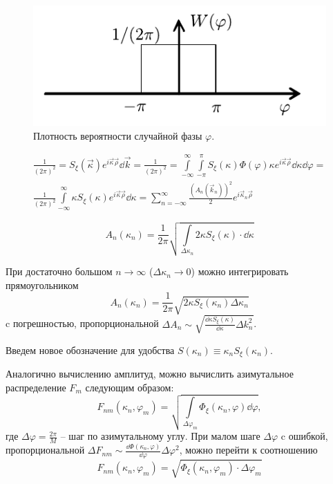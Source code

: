 \documentclass[a4paper,14pt]{extarticle}
\renewcommand*{\phi}{\varphi}
\begin{document}
\begin{figure}[ht]
    \centering
    \includegraphics[scale=1]{fig/image65}
    \caption{Плотность вероятности случайной фазы $\phi$.}
    \label{fig:phase}
\end{figure}


\begin{gather}
    \frac{1}{(2 \pi)^2} = S_{\xi}(\vec \kappa) e^{i \vec \kappa \vec \rho} \dd \vec k = 
    \frac{1}{(2 \pi)^2} = 
        \int\limits_{-\infty}^{\infty}
        \int\limits_{- \pi}^{\pi} 
    S_\xi(\kappa) \Phi(\phi) \kappa e^{i \vec \kappa\vec \rho} \dd \kappa \dd \phi = \\
    \frac{1}{(2 \pi)^2} \int\limits_{-\infty}^{\infty} \kappa S_\xi
    (\kappa) e^{i \vec \kappa 
    \vec \rho} \dd \kappa = \sum\limits_{n=-\infty}^{\infty} \frac{(A_n(\vec
k_n))^2}{2} e^{i \vec \kappa_n \vec \rho} 
\end{gather}

\begin{equation}
    \label{eq:Amplitude}
    A_n(\kappa_n) = \frac{1}{2 \pi} \sqrt{\int\limits_{\Delta \kappa_n} 2
        \kappa S_\xi(\kappa)
    \cdot \dd \kappa}
\end{equation}

При достаточно большом $n \to \infty$ ($\Delta \kappa_n \to 0$) можно интегрировать
прямоугольником
\begin{equation}
    A_n(\kappa_n) = \frac{1}{2 \pi} \sqrt{ 2 \kappa S_\xi(\kappa_n) \Delta
    \kappa_n}
\end{equation}
c погрешностью, пропорциональной $\Delta A_n \sim  \sqrt{\frac{\dd \kappa
    S_\xi(\kappa)}{\dd \kappa}
\Delta k_n^2}$. 

Введем новое
обозначение для удобства $S(\kappa_n)\equiv \kappa_n S_\xi (\kappa_n)$.

Аналогично вычислению амплитуд, можно вычислить азимутальное распределение $F_m$  следующим образом:
\begin{equation}
    F_{nm}(\kappa_n,\phi_m) = \sqrt{\int\limits_{\Delta \phi_m}
    \Phi_{\xi}(\kappa_n,\phi) \dd \phi},
\end{equation}
где $\Delta \phi = \frac{2\pi}{M}$ -- шаг по азимутальному углу.
При малом шаге  $\Delta \phi$ c ошибкой, пропорциональной $\Delta F_{nm} \sim
\frac{\dd \Phi(\kappa_n,\phi)}{\dd \phi} \Delta \phi^2$, можно перейти к соотношению
\begin{equation}
    F_{nm} (\kappa_n,\phi_m) = \sqrt{\Phi_\xi(\kappa_n,\phi_m) \cdot \Delta \phi_m}
\end{equation}
\end{document}
